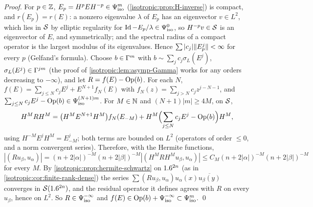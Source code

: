 \emph{Proof.} For $p\in\mathbb{Z}$, $E_p=H^pEH^{-p}\in\Psi^{m}_{\mathrm{iso}}$ (\cref{isotropic:prop:H-inverse}) is compact, and
$r(E_p)=r(E)$: a nonzero eigenvalue $\lambda$ of $E_p$ has an eigenvector $v\in L^2$, which lies in $\mathcal{S}$
by elliptic regularity for $\operatorname{Id}-E_p/\lambda\in\Psi^{0}_{\mathrm{iso}}$, so $H^{-p}v\in\mathcal{S}$ is an eigenvector of $E$, and
symmetrically; and the spectral radius of a compact operator is the largest modulus of its
eigenvalues. Hence $\sum|c_j|\lVert E_p^j\rVert<\infty$ for every $p$ (Gelfand's formula). Choose
$b\in\Gamma^{m}$ with $b\sim\sum_jc_j\sigma_L(E^j)$, $\sigma_L(E^j)\in\Gamma^{jm}$ (the proof of
\cref{isotropic:lem:asymp-Gamma} works for any orders decreasing to $-\infty$), and let $R=f(E)-\operatorname{Op}(b)$.
For each $N$, $f(E)=\sum_{j\le N}c_jE^j+E^{N+1}f_N(E)$ with $f_N(z)=\sum_{j>N}c_jz^{j-N-1}$, and
$\sum_{j\le N}c_jE^j-\operatorname{Op}(b)\in\Psi^{(N+1)m}_{\mathrm{iso}}$. For $M\in\mathbb{N}$ and $(N+1)|m|\ge4M$, on $\mathcal{S}$,
\begin{equation*}
  H^MRH^M=\bigl(H^ME^{N+1}H^M\bigr)f_N(E_{-M})+H^M\Bigl(\sum_{j\le N}c_jE^j-\operatorname{Op}(b)\Bigr)H^M,
\end{equation*}
using $H^{-M}E^jH^M=E_{-M}^j$; both terms are bounded on $L^2$ (operators of order $\le0$, and a norm
convergent series). Therefore, with the Hermite functions,
$|(Ru_\beta,u_\alpha)|=(n+2|\alpha|)^{-M}(n+2|\beta|)^{-M}|(H^MRH^Mu_\beta,u_\alpha)|\le C_M(n+2|\alpha|)^{-M}(n+2|\beta|)^{-M}$
for every $M$. By \cref{isotropic:prop:hermite-schwartz} on $1.6^{2n}$ (as in
\cref{isotropic:cor:finite-rank-dense}) the series $\sum(Ru_\beta,u_\alpha)u_\alpha(x)\overline{u_\beta(y)}$
converges in $\mathcal{S}(1.6^{2n})$, and the residual operator it defines agrees with $R$ on every $u_\beta$, hence
on $L^2$. So $R\in\Psi^{-\infty}_{\mathrm{iso}}$ and $f(E)\in\operatorname{Op}(b)+\Psi^{-\infty}_{\mathrm{iso}}\subset\Psi^{m}_{\mathrm{iso}}$. \qed
